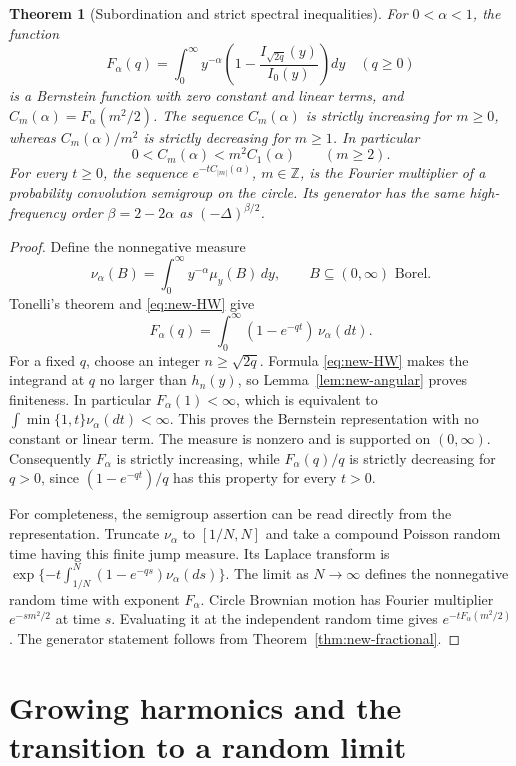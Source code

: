 \documentclass[11pt,a4paper]{article}
\newtheorem{theorem}{Theorem}[section]
\theoremstyle{definition}
\theoremstyle{remark}\newtheorem{remark}[theorem]{Remark}
\begin{document}
\begin{theorem}[Subordination and strict spectral inequalities]
\label{thm:new-Bernstein}
For $0<\alpha<1$, the function
\[
 F_\alpha(q)=\int_0^\infty y^{-\alpha}
 \left(1-\frac{I_{\sqrt{2q}}(y)}{I_0(y)}\right)dy
 \quad(q\geq0)
\]
is a Bernstein function with zero constant and linear terms, and
$C_m(\alpha)=F_\alpha(m^2/2)$.  The sequence $C_m(\alpha)$ is strictly
increasing for $m\geq0$, whereas $C_m(\alpha)/m^2$ is strictly decreasing for
$m\geq1$.  In particular
\[
 0<C_m(\alpha)<m^2C_1(\alpha)\qquad(m\geq2).
\]
For every $t\geq0$, the sequence $e^{-tC_{|m|}(\alpha)}$, $m\in\mathbb Z$,
is the Fourier multiplier of a probability convolution semigroup on the
circle.  Its generator has the same high-frequency order
$\beta=2-2\alpha$ as $(-\Delta)^{\beta/2}$.
\end{theorem}

\begin{proof}
Define the nonnegative measure
\[
 \nu_\alpha(B)=\int_0^\infty y^{-\alpha}\mu_y(B)\,dy,
 \qquad B\subseteq(0,\infty)\text{ Borel}.
\]
Tonelli's theorem and \eqref{eq:new-HW} give
\[
 F_\alpha(q)=\int_0^\infty(1-e^{-qt})\,\nu_\alpha(dt).
\]
For a fixed $q$, choose an integer $n\geq\sqrt{2q}$.  Formula
\eqref{eq:new-HW} makes the integrand at $q$ no larger than $h_n(y)$, so
Lemma~\ref{lem:new-angular} proves finiteness.  In particular
$F_\alpha(1)<\infty$, which is equivalent to
$\int\min\{1,t\}\nu_\alpha(dt)<\infty$.
This proves the Bernstein representation with no constant or linear term.
The measure is nonzero and is supported on $(0,\infty)$.
Consequently $F_\alpha$ is strictly increasing, while
$F_\alpha(q)/q$ is strictly decreasing for $q>0$, since
$(1-e^{-qt})/q$ has this property for every $t>0$.

For completeness, the semigroup assertion can be read directly from the
representation.  Truncate $\nu_\alpha$ to $[1/N,N]$ and take a compound
Poisson random time having this finite jump measure.  Its Laplace transform
is $\exp\{-t\int_{1/N}^N(1-e^{-qs})\nu_\alpha(ds)\}$.  The limit as
$N\to\infty$ defines the nonnegative random time with exponent $F_\alpha$.
Circle Brownian motion has Fourier multiplier $e^{-sm^2/2}$ at time $s$.
Evaluating it at the independent random time gives
$e^{-tF_\alpha(m^2/2)}$.  The generator statement follows from
Theorem~\ref{thm:new-fractional}.
\end{proof}

\section{Growing harmonics and the transition to a random limit}
\label{sec:growing-harmonics}
\end{document}
